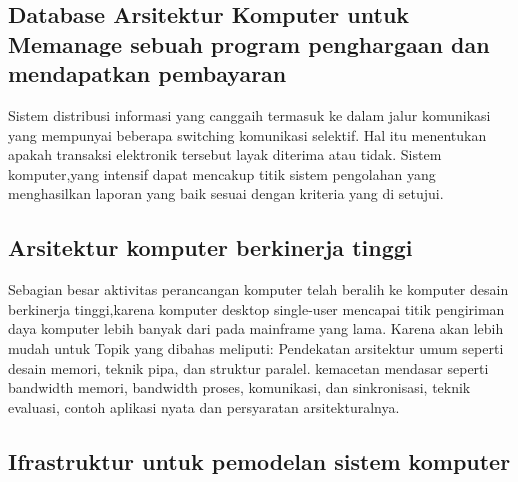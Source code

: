 	\subsection{Database Arsitektur Komputer untuk Memanage sebuah program penghargaan dan mendapatkan pembayaran}

	Sistem distribusi informasi yang canggaih termasuk ke dalam jalur komunikasi yang mempunyai beberapa switching komunikasi selektif. 
	Hal itu menentukan apakah transaksi elektronik tersebut layak diterima atau tidak.
	Sistem komputer,yang intensif dapat mencakup titik sistem pengolahan yang menghasilkan laporan yang baik sesuai dengan kriteria yang di setujui.\cite{robinson1998database}

	\subsection{Arsitektur komputer berkinerja tinggi}

	Sebagian besar aktivitas perancangan komputer telah beralih ke komputer desain berkinerja tinggi,karena komputer desktop single-user mencapai titik pengiriman daya komputer lebih banyak dari pada mainframe yang lama.
	Karena akan lebih mudah untuk Topik yang dibahas meliputi: Pendekatan arsitektur umum seperti desain memori, teknik pipa, dan struktur paralel. 
	kemacetan mendasar seperti bandwidth memori, bandwidth proses, komunikasi, dan sinkronisasi, teknik evaluasi, contoh aplikasi nyata dan persyaratan arsitekturalnya.\cite{stone1987high}

	\subsection{Ifrastruktur untuk pemodelan sistem komputer}

